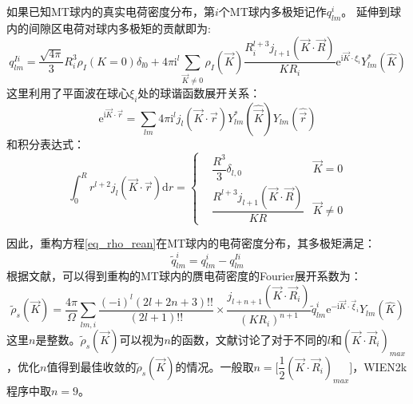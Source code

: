 如果已知\textrm{MT}球内的真实电荷密度分布，第$i$个\textrm{MT}球内多极矩记作$q_{lm}^i$。
延伸到球内的间隙区电荷对球内多极矩的贡献即为:
\begin{equation}
	q_{lm}^{Ii}=\dfrac{\sqrt{4\pi}}3R_i^3\rho_I(K=0)\delta_{l0}+4\pi\mathrm{i}^l\sum_{\vec K\neq 0}\rho_I(\vec K)\dfrac{R_i^{l+3}j_{l+1}(\vec K\cdot\vec R)}{KR_i}\mathrm{e}^{\mathrm{i}\vec K\cdot\xi_i}Y_{lm}^{\ast}(\hat K)
	\label{eq_multi_PW}
\end{equation}
这里利用了平面波在球心$\xi_i$处的球谐函数展开关系：
\begin{equation}
	\mathrm{e}^{\mathrm{i}\vec K\cdot \vec r}=\sum_{lm}4\pi\mathrm{i}^lj_l(\vec K\cdot\vec r)Y_{lm}^{\ast}(\hat{\vec K})Y_{lm}(\hat{\vec r})
	\label{eq_PW_Bessel}
\end{equation}
和积分表达式：
\begin{equation}
	\int_0^R r^{l+2}j_l(\vec K\cdot\vec r)\mathrm{d}r=\left\{
	\begin{aligned}
		&\dfrac{R^3}3\delta_{l,0}\quad &\vec K=0\\ 
		&\dfrac{R^{l+3}j_{l+1}(\vec K\cdot\vec R)}{KR} &\vec K\neq 0
	\end{aligned}\right.
	\label{eq_int_r_j}
\end{equation}

因此，重构方程\eqref{eq_rho_rean}在\textrm{MT}球内的电荷密度分布，其多极矩满足：
\begin{equation}
	\tilde q_{lm}^i=q_{lm}^i-q_{lm}^{Ii}
	\label{eq_psmult}
\end{equation}
根据文献，可以得到重构的\textrm{MT}球内的赝电荷密度的\textrm{Fourier}展开系数为：
\begin{equation}
	\tilde\rho_s(\vec K)=\dfrac{4\pi}{\Omega}\sum_{lm,i}\dfrac{(-\mathrm{i})^l(2l+2n+3)!!}{(2l+1)!!}\times\dfrac{j_{l+n+1}(\vec K\cdot\vec R_i)}{(KR_i)^{n+1}}\tilde q_{lm}^i\mathrm{e}^{-\mathrm{i}\vec K\cdot\vec\xi_i}Y_{lm}(\hat K)
	\label{eq_psrho}
\end{equation}
这里$n$是整数。$\tilde\rho_s(\vec K)$可以视为$n$的函数，文献讨论了对于不同的$l$和$(\vec K\cdot\vec R_i)_{max}$，优化$n$值得到最佳收敛的$\tilde\rho_s(\vec K)$的情况。一般取$n=\big[\dfrac12(\vec K\cdot\vec R_i)_{max}\big]$，\textrm{WIEN2k}程序中取$n=9$。

